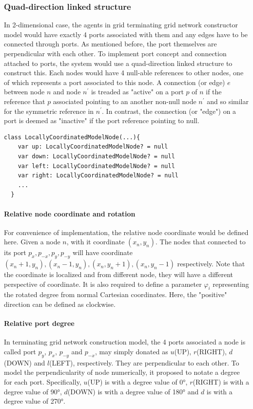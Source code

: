 \subsubsection{Quad-direction linked structure}
In 2-dimensional case, the agents in grid terminating grid network constructor model would have exactly 4 ports associated with them and
any edges have to be connected through ports. As mentioned before, the port themselves are perpendicular with each other.
To implement port concept and connection attached to ports,
the system would use a quad-direction linked structure to construct this. Each nodes would have 4 null-able references to other
nodes, one of which represents a port associated to this node. A connection (or edge) $e$ between node $n$ and node $n^{'}$ is treaded as "active" on a port $p$ of $n$ if the reference that
$p$ associated pointing to an another non-null node $n^{'}$ and so similar for the symmetric reference in $n^{'}$.
In contrast, the connection (or "edge") on a port is deemed as "inactive" if the port reference pointing to null.

\par\noindent
\begin{lstlisting}[caption = {Pseudo-code demonstration of quad-direction linked structure}, style = mykotlin]
  class LocallyCoordinatedModelNode(...){
    var up: LocallyCoordinatedModelNode? = null
    var down: LocallyCoordinatedModelNode? = null
    var left: LocallyCoordinatedModelNode? = null
    var right: LocallyCoordinatedModelNode? = null
    ...
  }
\end{lstlisting}

\paragraph{Relative node coordinate and rotation}
For convenience of implementation, the relative node coordinate would be defined here. Given
a node $n$, with it coordinate $(x_{n}, y_{n})$. The nodes that connected to its port $p_{x}, p_{-x}, p_{y}, p_{-y}$
will have coordinate $(x_{n} + 1, y_{n}), (x_{n} - 1, y_{n}), (x_{n}, y_{n} + 1), (x_{n}, y_{n} - 1)$ respectively.
Note that the coordinate is localized and from different node, they will have a different perspective of coordinate.
It is also required to define a parameter $\varphi_{i}$ representing the rotated degree from normal Cartesian coordinates.
Here, the "positive" direction can be defined as clockwise.

\paragraph{Relative port degree}
In terminating grid network construction model, the 4 ports associated a node is called
port $p_{y}$, $p_{x}$, $p_{-y}$ and $p_{-x}$, may simply donated as $u$(UP), $r$(RIGHT), $d$(DOWN) and $l$(LEFT), respectively.
They are perpendicular to each other. To model the perpendicularity of node numerically,
it proposed to notate a degree for each port. Specifically, $u$(UP) is with a degree value of
\ang{0},  $r$(RIGHT) is with a degree value of \ang{90}, $d$(DOWN) is with a degree value of
\ang{180} and $d$ is with a degree value of \ang{270}.

